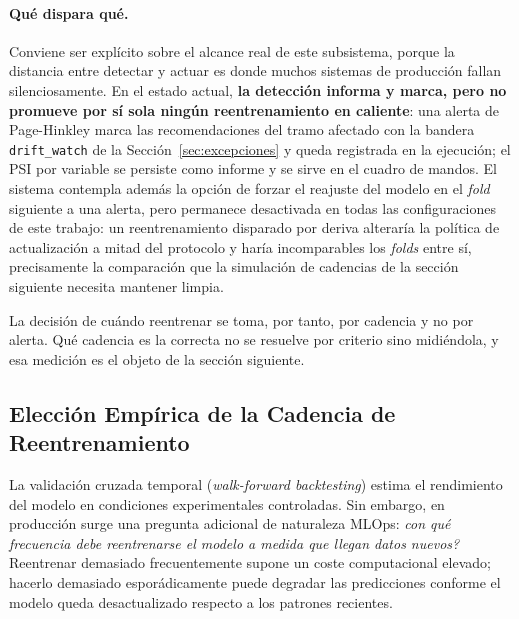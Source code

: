 \paragraph{Qué dispara qué.} Conviene ser explícito sobre el alcance real de este subsistema, porque la distancia entre detectar y actuar es donde muchos sistemas de producción fallan silenciosamente. En el estado actual, \textbf{la detección informa y marca, pero no promueve por sí sola ningún reentrenamiento en caliente}: una alerta de Page-Hinkley marca las recomendaciones del tramo afectado con la bandera \texttt{drift\_watch} de la Sección~\ref{sec:excepciones} y queda registrada en la ejecución; el PSI por variable se persiste como informe y se sirve en el cuadro de mandos. El sistema contempla además la opción de forzar el reajuste del modelo en el \textit{fold} siguiente a una alerta, pero permanece desactivada en todas las configuraciones de este trabajo: un reentrenamiento disparado por deriva alteraría la política de actualización a mitad del protocolo y haría incomparables los \textit{folds} entre sí, precisamente la comparación que la simulación de cadencias de la sección siguiente necesita mantener limpia.

La decisión de cuándo reentrenar se toma, por tanto, por cadencia y no por alerta. Qué cadencia es la correcta no se resuelve por criterio sino midiéndola, y esa medición es el objeto de la sección siguiente.
\subsection{Elección Empírica de la Cadencia de Reentrenamiento}
\label{sec:simulate_ops}

La validación cruzada temporal (\textit{walk-forward backtesting}) estima el rendimiento del modelo en condiciones experimentales controladas. Sin embargo, en producción surge una pregunta adicional de naturaleza MLOps: \emph{\textquestiondown con qué frecuencia debe reentrenarse el modelo a medida que llegan datos nuevos?} Reentrenar demasiado frecuentemente supone un coste computacional elevado; hacerlo demasiado esporádicamente puede degradar las predicciones conforme el modelo queda desactualizado respecto a los patrones recientes.

